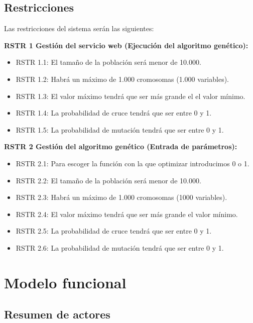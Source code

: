 \bigskip
\subsection{Restricciones}

\bigskip
Las restricciones del sistema serán las siguientes:

\bigskip
\textbf{RSTR 1 Gestión del servicio web (Ejecución del algoritmo genético):}

\begin{itemize}
	\item RSTR 1.1: El tamaño de la población será menor de 10.000.
	\item RSTR 1.2: Habrá un máximo de 1.000 cromosomas (1.000 variables).
	\item RSTR 1.3: El valor máximo tendrá que ser más grande el el valor mínimo.
	\item RSTR 1.4: La probabilidad de cruce tendrá que ser entre 0 y 1.
	\item RSTR 1.5: La probabilidad de mutación tendrá que ser entre 0 y 1.
\end{itemize}

\newpage %

\bigskip
\textbf{RSTR 2 Gestión del algoritmo genético (Entrada de parámetros):}

\begin{itemize}
	\item RSTR 2.1: Para escoger la función con la que optimizar introducimos 0 o 1.
	\item RSTR 2.2: El tamaño de la población será menor de 10.000.
	\item RSTR 2.3: Habrá un máximo de 1.000 cromosomas (1000 variables).
	\item RSTR 2.4: El valor máximo tendrá que ser más grande el valor mínimo.
	\item RSTR 2.5: La probabilidad de cruce tendrá que ser entre 0 y 1.
	\item RSTR 2.6: La probabilidad de mutación tendrá que ser entre 0 y 1.
\end{itemize}


\newpage
\section{Modelo funcional}


\bigskip
\subsection{Resumen de actores}

